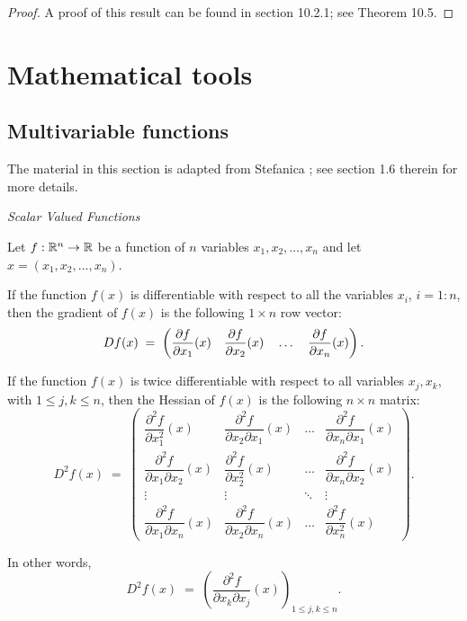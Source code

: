 \begin{proof}
A proof of this result can be found in section 10.2.1; see Theorem 10.5.
\end{proof}

\section{Mathematical tools}

\subsection{Multivariable functions}

The material in this section is adapted from Stefanica \cite{36}; see section 1.6
therein for more details.

\textit{Scalar Valued Functions}

Let $f : \mathbb{R}^n \to \mathbb{R}$ be a function of $n$ variables $x_1,x_2,\ldots,x_n$ and let
$x = (x_1,x_2,\ldots,x_n)$.

If the function $f(x)$ is differentiable with respect to all the variables $x_i$,
$i = 1:n$, then the gradient of $f(x)$ is the following $1 \times n$ row vector:
\begin{equation}
Df(x) \;=\; \left(\frac{\partial f}{\partial x_1}(x) \quad \frac{\partial f}{\partial x_2}(x) \quad \ldots \quad \frac{\partial f}{\partial x_n}(x)\right).
\end{equation}

If the function $f(x)$ is twice differentiable with respect to all variables $x_j,
x_k$, with $1 \le j,k \le n$, then the Hessian of $f(x)$ is the following $n \times n$
matrix:
\begin{equation}
D^2f(x) \;=\; \begin{pmatrix}
\dfrac{\partial^2 f}{\partial x_1^2}(x) & \dfrac{\partial^2 f}{\partial x_2\partial x_1}(x) & \ldots & \dfrac{\partial^2 f}{\partial x_n\partial x_1}(x) \\[1.2ex]
\dfrac{\partial^2 f}{\partial x_1\partial x_2}(x) & \dfrac{\partial^2 f}{\partial x_2^2}(x) & \ldots & \dfrac{\partial^2 f}{\partial x_n\partial x_2}(x) \\[1.2ex]
\vdots & \vdots & \ddots & \vdots \\[0.6ex]
\dfrac{\partial^2 f}{\partial x_1\partial x_n}(x) & \dfrac{\partial^2 f}{\partial x_2\partial x_n}(x) & \ldots & \dfrac{\partial^2 f}{\partial x_n^2}(x)
\end{pmatrix}.
\end{equation}

In other words,
\begin{equation}
D^2f(x) \;=\; \left(\frac{\partial^2 f}{\partial x_k\partial x_j}(x)\right)_{1\le j,k\le n}.
\end{equation}

